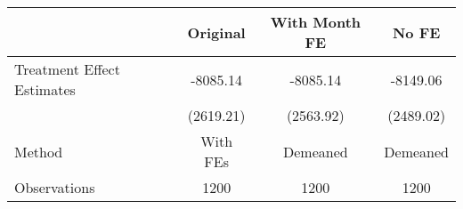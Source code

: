 \begin{tabular}{l*{3}{c}}
\hline\hline
                    &\multicolumn{1}{c}{Original}&\multicolumn{1}{c}{With Month FE}&\multicolumn{1}{c}{No FE}\\
\hline
Treatment Effect Estimates&    -8085.14&    -8085.14&    -8149.06\\
                    &   (2619.21)&   (2563.92)&   (2489.02)\\
\hline
Method              &    With FEs&    Demeaned&    Demeaned\\
Observations        &        1200&        1200&        1200\\
\hline\hline
\end{tabular}
